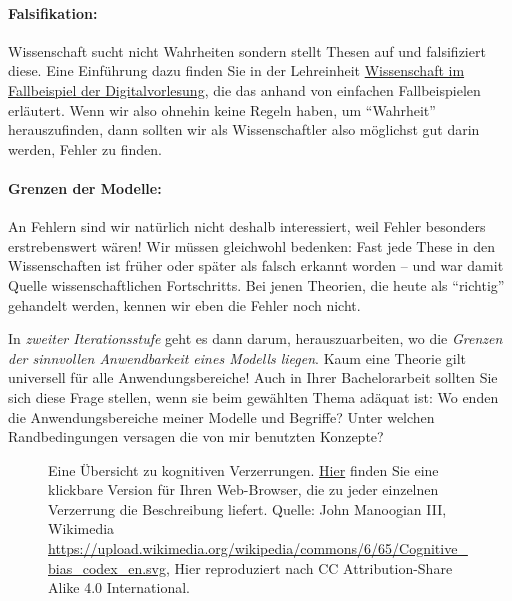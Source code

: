 \paragraph{Falsifikation:}
Wissenschaft sucht nicht Wahrheiten sondern stellt Thesen auf und falsifiziert diese.
Eine Einführung dazu finden Sie in 
der Lehreinheit \hyperlink{Digitalvorlesung}{Wissenschaft im Fallbeispiel der Digitalvorlesung},
die das anhand von einfachen Fallbeispielen erläutert.
Wenn wir also ohnehin keine Regeln haben, um \enquote{Wahrheit} herauszufinden, dann sollten wir
als Wissenschaftler also möglichst gut darin werden, Fehler zu finden.

\paragraph{Grenzen der Modelle:}
An Fehlern sind wir natürlich nicht deshalb interessiert,
weil Fehler besonders erstrebenswert wären! Wir müssen gleichwohl bedenken: Fast jede These in den Wissenschaften ist früher
oder später als falsch erkannt worden -- und war damit Quelle wissenschaftlichen Fortschritts. 
Bei jenen Theorien, die heute als \enquote{richtig} gehandelt werden,
kennen wir eben die Fehler noch nicht.

In \textit{zweiter Iterationsstufe} geht es dann darum, herauszuarbeiten,
wo die \textit{Grenzen der sinnvollen Anwendbarkeit eines Modells liegen}. Kaum eine Theorie gilt universell für alle
Anwendungsbereiche!
Auch in Ihrer Bachelorarbeit sollten Sie sich diese Frage stellen, wenn sie beim gewählten Thema adäquat ist: 
Wo enden die Anwendungsbereiche meiner Modelle und Begriffe?
Unter welchen Randbedingungen versagen die von mir benutzten Konzepte? 

\begin{figure}
\begin{center}
\end{center}
\caption[Übersicht zu kognitiven Verzerrungen]{Eine Übersicht zu kognitiven Verzerrungen.
\href{https://upload.wikimedia.org/wikipedia/commons/6/65/Cognitive_bias_codex_en.svg}{Hier} finden Sie eine klickbare Version für Ihren Web-Browser, die zu jeder einzelnen Verzerrung die Beschreibung liefert.
\scriptsize
Quelle: John Manoogian III,
Wikimedia \url{https://upload.wikimedia.org/wikipedia/commons/6/65/Cognitive_bias_codex_en.svg},
Hier reproduziert nach CC Attribution-Share Alike 4.0 International.
}
\end{figure}

